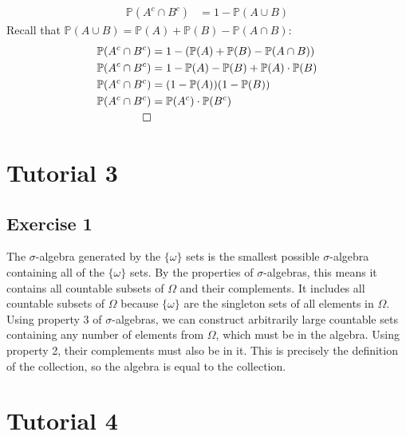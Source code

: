 \documentclass{article}
\begin{document}
\begin{itemize}
\begin{align*}
            \mathbb{P}(A^c \cap B^c) &= 1 - \mathbb{P}(A \cup B)
        \end{align*}
        Recall that $\mathbb{P}(A \cup B) = \mathbb{P}(A) + \mathbb{P}(B) - \mathbb{P}(A \cap B)$:
        \begin{align*}
            \mathbb{P}(A^c \cap B^c) &= 1 - (\mathbb{P}(A) + \mathbb{P}(B) - \mathbb{P}(A \cap B)) \\
            \mathbb{P}(A^c \cap B^c) &= 1 - \mathbb{P}(A) - \mathbb{P}(B) + \mathbb{P}(A)\cdot\mathbb{P}(B) \\
            \mathbb{P}(A^c \cap B^c) &= (1 - \mathbb{P}(A))(1 - \mathbb{P}(B)) \\
            \mathbb{P}(A^c \cap B^c) &= \mathbb{P}(A^c)\cdot\mathbb{P}(B^c) \\
            \qed
        \end{align*}
    \end{itemize}

\section*{Tutorial 3}
\subsection*{Exercise 1}
The $\sigma$-algebra generated by the $\{\omega\}$ sets is the smallest possible $\sigma$-algebra containing all of the $\{\omega\}$ sets. By the properties of $\sigma$-algebras, this means it contains all countable subsets of $\Omega$ and their complements. It includes all countable subsets of $\Omega$ because $\{\omega\}$ are the singleton sets of all elements in $\Omega$. Using property 3 of $\sigma$-algebras, we can construct arbitrarily large countable sets containing any number of elements from $\Omega$, which must be in the algebra. Using property 2, their complements must also be in it. This is precisely the definition of the collection, so the algebra is equal to the collection.

\section*{Tutorial 4}
\end{document}

